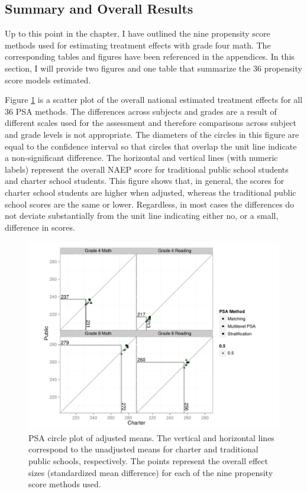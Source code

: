 \documentclass[letterpaper,12p,twoside]{article} %
\begin{document}
\subsection{Summary and Overall Results}

Up to this point in the chapter, I have outlined the nine propensity score methods used for estimating treatment effects with grade four math. The corresponding tables and figures have been referenced in the appendices. In this section, I will provide two figures and one table that summarize the 36 propensity score models estimated.

Figure \ref{fig:overallcirc} is a scatter plot of the overall national estimated treatment effects for all 36 PSA methods. The differences across subjects and grades are a result of different scales used for the assessment and therefore comparisons across subject and grade levels is not appropriate. The diameters of the circles in this figure are equal to the confidence interval so that circles that overlap the unit line indicate a non-significant difference. The horizontal and vertical lines (with numeric labels) represent the overall NAEP score for traditional public school students and charter school students. This figure shows that, in general, the scores for charter school students are higher when adjusted, whereas the traditional public school scores are the same or lower. Regardless, in most cases the differences do not deviate substantially from the unit line indicating either no, or a small, difference in scores.

\begin{figure}[t]
\begin{center}
\includegraphics[width=\textwidth]{../Figures2009/OverallScatter.pdf}
\caption[PSA circle plot of adjusted means]{PSA circle plot of adjusted means. The vertical and horizontal lines correspond to the unadjusted means for charter and traditional public schools, respectively. The points represent the overall effect sizes (standardized mean difference) for each of the nine propensity score methods used.}
\label{fig:overallcirc}
\end{center}
\end{figure}
\end{document}
